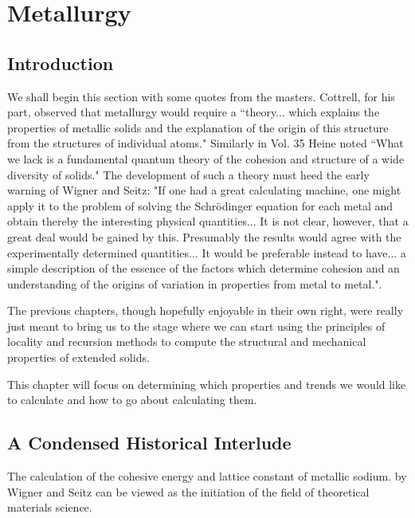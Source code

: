 \chapter{Metallurgy}
\label{chap:metallurgy}
\section{Introduction}
We shall begin this section with some quotes from the masters.
Cottrell, for his part, observed that 
metallurgy would require a ``theory... which explains
the properties of metallic solids and the explanation of the origin of this
structure from the structures of individual atoms." Similarly in Vol. 35
Heine noted ``What we lack is a fundamental quantum theory of the cohesion
and structure of a wide diversity of solids." 
The development of such a theory must heed the early warning of Wigner and Seitz: 
"If one had a great calculating machine, one might 
apply it to the problem of solving the Schr\"odinger equation for each metal
and obtain thereby the interesting physical quantities... It is not clear, however,
that a great deal would be gained by this. Presumably the results would agree
with the experimentally determined quantities... It would be preferable instead
to have... a simple description of the essence of the factors which determine cohesion
and an understanding of the origins of variation in properties from metal to metal."\cite{wigner55}.

The previous chapters, though hopefully enjoyable in their own right, 
were really just meant to bring us to the stage where we can start 
using the principles of locality and recursion methods to compute 
the structural and 
mechanical properties of extended solids. 

This chapter will focus on determining which properties and trends we would like
to calculate and how to go about calculating them.

%
\section{A Condensed Historical Interlude}
The calculation of the cohesive energy and lattice constant of 
metallic sodium\cite{wigner34a, wigner33,wigner34b}.
by Wigner and Seitz can be viewed as the initiation of the field
of theoretical materials science.

